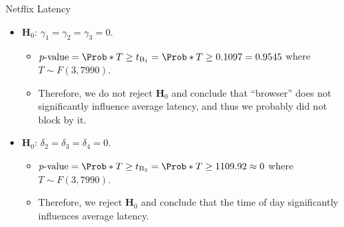 \begin{Example}{Netflix Latency}{}
\begin{itemize}
\begin{itemize}
                              and hence the expected response is \underline{not} the same in each condition.
                  \end{itemize}
            \item $ \mathbf{H}_0 $: $ \gamma_1=\gamma_2=\gamma_3=0 $.
                  \begin{itemize}
                        \item $ p\text{-value}=\Prob*{T\ge t_{\text{B}_1}}=\Prob*{T\ge 0.1097}=0.9545 $ where $ T \sim F(3,7990) $.
                        \item Therefore, we do not reject $ \mathbf{H}_0 $ and conclude that ``browser'' does not
                              significantly influence average latency, and thus we probably did not block by it.
                  \end{itemize}
            \item $ \mathbf{H}_0 $: $ \delta_2=\delta_3=\delta_4=0 $.
                  \begin{itemize}
                        \item $ p\text{-value}=\Prob*{T\ge t_{\text{B}_2}}=\Prob*{T\ge 1109.92}\approx 0 $ where $ T \sim F(3,7990) $.
                        \item Therefore, we reject $ \mathbf{H}_0 $ and conclude that the time of day significantly influences average latency.
                  \end{itemize}
      \end{itemize}
\end{Example}

